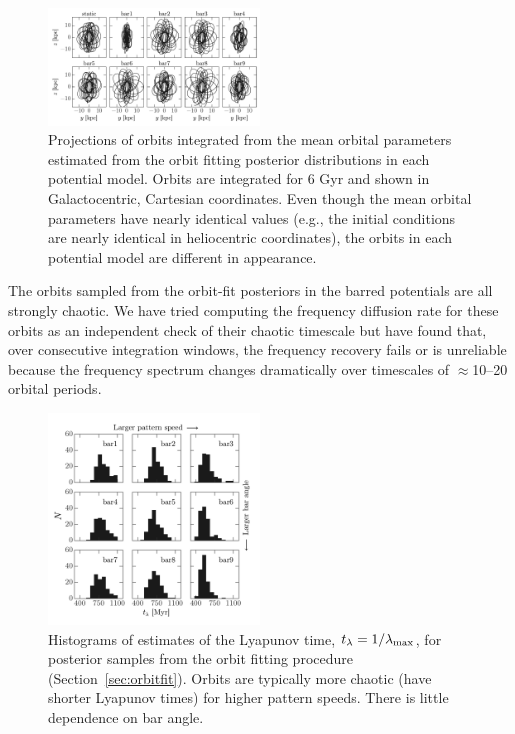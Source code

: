 \documentclass[numberedappendix]{emulateapj}
\newcommand{\lyapexp}{\lambda_{\rm max}}
\newcommand{\lyapt}{t_\lambda}
\begin{document}
\begin{figure}[!tbp]
\begin{center}
\includegraphics[width=0.5\textwidth]{figures/orbit-yz}
\caption{  Projections of orbits integrated from the mean orbital parameters estimated from the orbit fitting posterior distributions in each potential model. Orbits are integrated for 6 Gyr and shown in Galactocentric, Cartesian coordinates. Even though the mean orbital parameters have nearly identical values (e.g., the initial conditions are nearly identical in heliocentric coordinates), the orbits in each potential model are  different in appearance. }
\label{fig:orbits-yz}
\end{center}
\end{figure}

The orbits sampled from the orbit-fit posteriors in the barred potentials are all strongly chaotic. We have tried computing the frequency diffusion rate for these orbits as an independent check of their chaotic timescale but have found that, over consecutive integration windows, the frequency recovery fails or is unreliable because the frequency spectrum changes dramatically over timescales of $\approx$10--20 orbital periods. 

\begin{figure}[!tbp]
\begin{center}
\includegraphics[width=0.5\textwidth]{figures/lyapunov-hist}
\caption{ Histograms of estimates of the Lyapunov time, $\lyapt=1/\lyapexp$, for posterior samples from the orbit fitting procedure (Section~\ref{sec:orbitfit}). Orbits are typically more chaotic (have shorter Lyapunov times) for higher pattern speeds. There is little dependence on bar angle.}
\label{fig:lyapunov-hist}
\end{center}
\end{figure}
\end{document}
